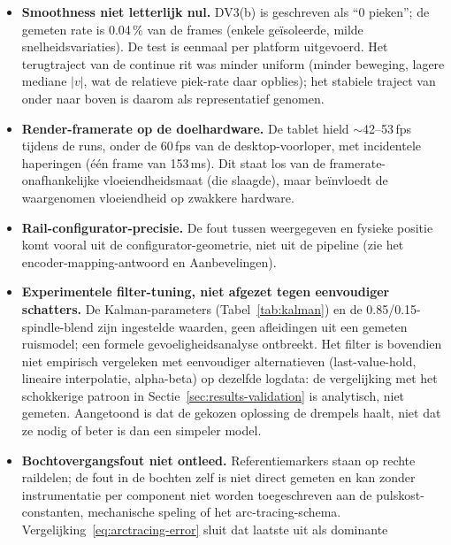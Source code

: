 \documentclass[10pt, a4paper, twocolumn]{article}
\begin{document}
\begin{itemize}[leftmargin=*]
    meetlint-aflezing $\approx\pm$1\,mm onzeker is en de richtingsherhaalbaarheid
    4.1\,mm bedraagt. De pass valt daarmee binnen de meetonzekerheid zelf: een
    herhaalde run zou het criterium even goed nipt kunnen missen als halen. Hij moet
    worden gelezen als ``binnen tolerantie op deze run'', niet als een ruime marge.
  \item \textbf{Smoothness niet letterlijk nul.}
    DV3(b) is geschreven als ``0 pieken''; de gemeten rate is 0.04\,\% van de
    frames (enkele geïsoleerde, milde snelheidsvariaties). De test is eenmaal per
    platform uitgevoerd. Het terugtraject van de continue rit was minder uniform
    (minder beweging, lagere mediane $|v|$, wat de relatieve piek-rate daar
    opblies); het stabiele traject van onder naar boven is daarom als
    representatief genomen.
  \item \textbf{Render-framerate op de doelhardware.} De tablet hield
    $\sim$42--53\,fps tijdens de runs, onder de 60\,fps van de desktop-voorloper,
    met incidentele haperingen (één frame van 153\,ms). Dit staat los van de
    framerate-onafhankelijke vloeiendheidsmaat (die slaagde), maar
    beïnvloedt de waargenomen vloeiendheid op zwakkere hardware.
  \item \textbf{Rail-configurator-precisie.} De fout
    tussen weergegeven en fysieke positie komt vooral uit de
    configurator-geometrie, niet uit de pipeline (zie het encoder-mapping-antwoord
    en Aanbevelingen).
  \item \textbf{Experimentele filter-tuning, niet afgezet tegen eenvoudiger
    schatters.} De Kalman-parameters (Tabel~\ref{tab:kalman}) en de
    0.85/0.15-spindle-blend zijn ingestelde waarden, geen afleidingen uit een
    gemeten ruismodel; een formele gevoeligheidsanalyse ontbreekt. Het filter is
    bovendien niet empirisch vergeleken met eenvoudiger alternatieven
    (last-value-hold, lineaire interpolatie, alpha-beta) op dezelfde logdata: de
    vergelijking met het schokkerige patroon in Sectie~\ref{sec:results-validation} is analytisch,
    niet gemeten. Aangetoond is dat de gekozen oplossing de drempels haalt, niet
    dat ze nodig of beter is dan een simpeler model.
  \item \textbf{Bochtovergangsfout niet ontleed.} Referentiemarkers staan op
    rechte raildelen; de fout in de bochten zelf is niet direct gemeten en kan
    zonder instrumentatie per component niet worden toegeschreven aan de
    pulskost-constanten, mechanische speling of het arc-tracing-schema.
    Vergelijking~\ref{eq:arctracing-error} sluit dat laatste uit als dominante

\end{itemize}
\end{document}
